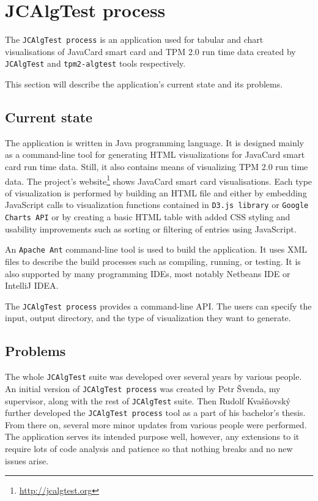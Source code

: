 \section{JCAlgTest process}
The \texttt{JCAlgTest process} is an application used for tabular and chart visualisations of JavaCard smart card and TPM 2.0 run time data created by \texttt{JCAlgTest} and \texttt{tpm2-algtest} tools respectively. 

This section will describe the application's current state and its problems.
\subsection{Current state}

The application is written in Java programming language. It is designed mainly as a command-line tool for generating HTML visualizations for JavaCard smart card run time data. Still, it also contains means of visualizing TPM 2.0 run time data. The project's website\footnote{\url{http://jcalgtest.org}} shows JavaCard smart card visualisations. Each type of visualization is performed by building an HTML file and either by embedding JavaScript calls to visualization functions contained in  \texttt{D3.js library} or \texttt{Google Charts API} or by creating a basic HTML table with added CSS styling and usability improvements such as sorting or filtering of entries using JavaScript. 

An \texttt{Apache Ant} command-line tool is used to build the application. It uses XML files to describe the build processes such as compiling, running, or testing. It is also supported by many programming IDEs, most notably Netbeans IDE or IntelliJ IDEA.

The \texttt{JCAlgTest process} provides a command-line API. The users can specify the input, output directory, and the type of visualization they want to generate.

\subsection{Problems}\label{subsec:design-problems}
The whole \texttt{JCAlgTest} suite was developed over several years by various people. An initial version of \texttt{JCAlgTest process} was created by Petr Švenda, my supervisor, along with the rest of \texttt{JCAlgTest} suite. Then Rudolf Kvašňovský further developed the \texttt{JCAlgTest process} tool as a part of his bachelor's thesis. From there on, several more minor updates from various people were performed. The application serves its intended purpose well, however, any extensions to it require lots of code analysis and patience so that nothing breaks and no new issues arise.

